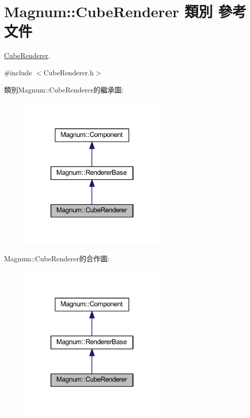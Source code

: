 \hypertarget{class_magnum_1_1_cube_renderer}{}\section{Magnum\+:\+:Cube\+Renderer 類別 參考文件}
\label{class_magnum_1_1_cube_renderer}


\hyperlink{class_magnum_1_1_cube_renderer}{Cube\+Renderer}.  




{\ttfamily \#include $<$Cube\+Renderer.\+h$>$}



類別\+Magnum\+:\+:Cube\+Renderer的繼承圖\+:\nopagebreak
\begin{figure}[H]
\begin{center}
\leavevmode
\includegraphics[width=202pt]{class_magnum_1_1_cube_renderer__inherit__graph}
\end{center}
\end{figure}


Magnum\+:\+:Cube\+Renderer的合作圖\+:\nopagebreak
\begin{figure}[H]
\begin{center}
\leavevmode
\includegraphics[width=202pt]{class_magnum_1_1_cube_renderer__coll__graph}
\end{center}
\end{figure}
